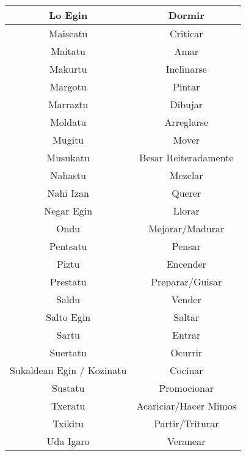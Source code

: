 \documentclass[11pt, a4paper]{article}
\begin{document}
\begin{longtable}{cc}
\hline
Lo Egin                    & Dormir                      \\ 
\hline
Maiseatu                   & Criticar                    \\ 
\hline
Maitatu                    & Amar                        \\ 
\hline
Makurtu                    & Inclinarse                  \\ 
\hline
Margotu                    & Pintar                      \\ 
\hline
Marraztu                   & Dibujar                     \\ 
\hline
Moldatu                    & Arreglarse                  \\ 
\hline
Mugitu                     & Mover                       \\ 
\hline
Musukatu                   & Besar Reiteradamente        \\ 
\hline
Nahastu                    & Mezclar                     \\ 
\hline
Nahi Izan                  & Querer                      \\ 
\hline
Negar Egin                 & Llorar                      \\ 
\hline
Ondu                       & Mejorar/Madurar             \\ 
\hline
Pentsatu                   & Pensar                      \\ 
\hline
Piztu                      & Encender                    \\ 
\hline
Prestatu                   & Preparar/Guisar             \\ 
\hline
Saldu                      & Vender                      \\ 
\hline
Salto Egin                 & Saltar                      \\ 
\hline
Sartu                      & Entrar                      \\ 
\hline
Suertatu                   & Ocurrir                     \\ 
\hline
Sukaldean Egin / Kozinatu  & Cocinar                     \\ 
\hline
Sustatu                    & Promocionar                 \\ 
\hline
Txeratu                    & Acariciar/Hacer Mimos       \\ 
\hline
Txikitu                    & Partir/Triturar             \\ 
\hline
Uda Igaro                  & Veranear                    \\ 

\end{longtable}
\end{document}
